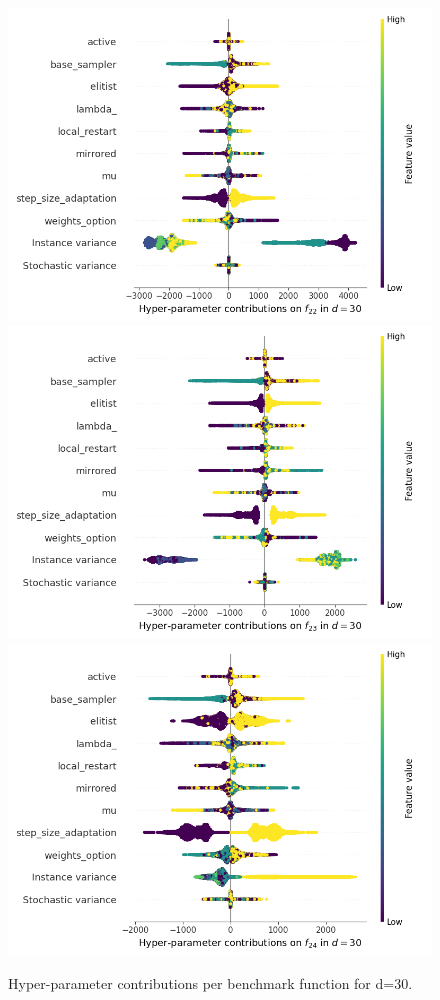 \begin{figure}[t]
	\includegraphics[height=0.15\textheight,trim=60mm 0mm 30mm 0mm,clip]{cma_img_new/img_summary_f22_d30.png}
	\includegraphics[height=0.15\textheight,trim=60mm 0mm 30mm 0mm,clip]{cma_img_new/img_summary_f23_d30.png}
	\includegraphics[height=0.15\textheight,trim=60mm 0mm 0mm 0mm,clip]{cma_img_new/img_summary_f24_d30.png}
\caption{Hyper-parameter contributions per benchmark function for d=30. \label{fig:shapxplaind30}}

\end{figure}

